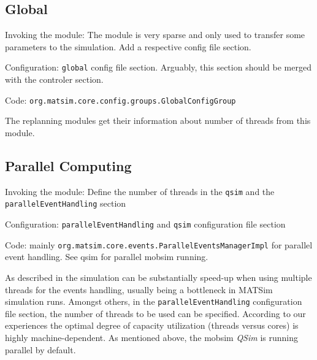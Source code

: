 
\subsection{Global}
\label{sec:global}
\begin{compactitem}
\item Invoking the module: The module is very sparse and only used to transfer some parameters to the simulation. Add a respective config file section.
\item Configuration: \lstinline|global| config file section. Arguably, this section should be merged with the controler section.
\item Code: \lstinline|org.matsim.core.config.groups.GlobalConfigGroup|
\end{compactitem}

The replanning modules get their information about number of threads from this module. 


\subsection{Parallel Computing}
\label{sec:parallelcomputing}
\begin{compactitem}
\item Invoking the module: Define the number of threads in the \lstinline|qsim| and the \lstinline|parallelEventHandling| section
\item Configuration: \lstinline|parallelEventHandling| and \lstinline|qsim| configuration file section
\item Code: mainly \lstinline|org.matsim.core.events.ParallelEventsManagerImpl| for parallel event handling. See qsim for parallel mobsim running.
\end{compactitem}

As described in \citet[][]{WaraichEtAl_TechRep_IVT_2009, WaraichEtAl_STRC_2009} the simulation can be substantially speed-up when using multiple threads for the events handling, usually being a bottleneck in MATSim simulation runs. Amongst others, in the \lstinline|parallelEventHandling| configuration file section, the number of threads to be used can be specified. 
According to our experiences the optimal degree of capacity utilization (threads versus cores) is highly machine-dependent.
As mentioned above, the mobsim \emph{QSim} is running parallel by default.

